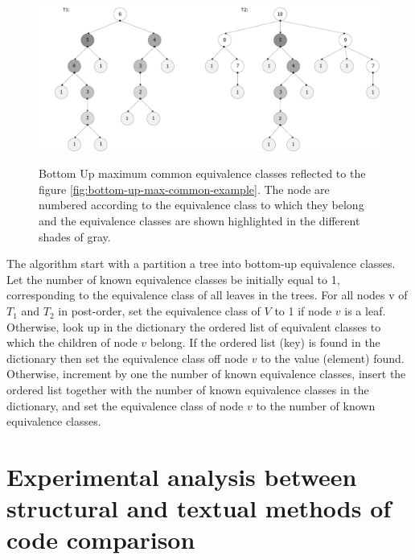 \documentclass{report}
\begin{document}
\begin{figure}[h]
  \centering
  \includegraphics[scale=0.45]{Figures/algorithms/BU/bottom-up-max-common-example-equivalence.pdf}\\[0.1cm]
  \caption[Bottom Up maximum common equivalence classes on trees] { Bottom Up maximum common equivalence classes reflected to the figure \ref{fig:bottom-up-max-common-example}. The node are numbered according to the equivalence class to which they belong and the equivalence classes are shown highlighted in the different shades of gray\cite{valiente}.}
  \label{fig:bottom-up-max-common-example-equivalence}
\end{figure}

The algorithm start with a partition a tree into bottom-up equivalence classes.
Let the number of known equivalence classes be initially equal to 1, corresponding to the equivalence class of all leaves in the trees. For all nodes v of $ T_{1}$ and $ T_{2 }$ in post-order, set the equivalence class of $V$ to 1 if node $v$ is a leaf. Otherwise, look up in the dictionary the ordered list of equivalent classes to which the children of node $v$ belong. If the ordered list (key) is found in the dictionary then set the equivalence class off node $v$ to the value (element) found. Otherwise, increment by one the number of known equivalence classes, insert the ordered list together with the number of known equivalence classes in the dictionary, and set the equivalence class of node $v$ to the number of known equivalence classes.


\chapter{Experimental analysis between structural and textual methods of code comparison}
\label{cha:experimental}
\end{document}
